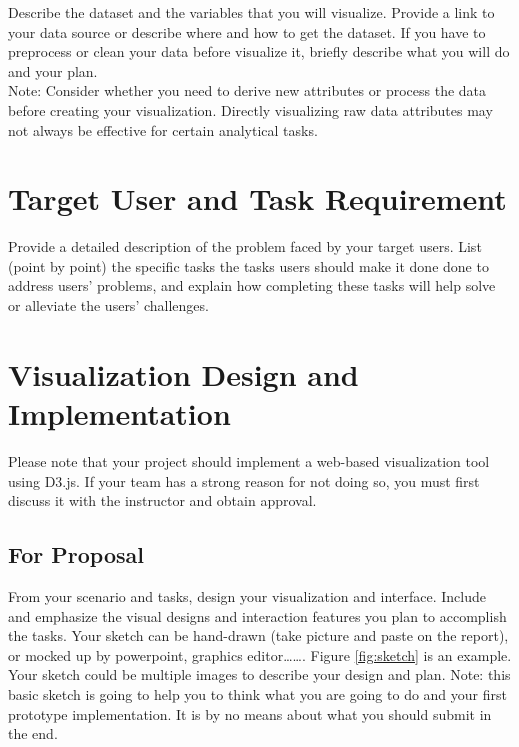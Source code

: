 \documentclass[journal]{IEEEtran}
\begin{document}
Describe the dataset and the variables that you will visualize. Provide a link to your data source or describe where and how to get the dataset. If you have to preprocess or clean your data before visualize it, briefly describe what you will do and your plan. \\

Note: Consider whether you need to derive new attributes or process the data before creating your visualization. Directly visualizing raw data attributes may not always be effective for certain analytical tasks. 


\section{Target User and Task Requirement}

Provide a detailed description of the problem faced by your target users. List (point by point) the specific tasks the tasks users should make it done done to address users' problems, and explain how completing these tasks will help solve or alleviate the users’ challenges.


\section{Visualization Design and Implementation}

Please note that your project should implement a web-based visualization tool using D3.js. If your team has a strong reason for not doing so, you must first discuss it with the instructor and obtain approval.

\subsection{For Proposal}
From your scenario and tasks, design your visualization and interface.
Include and emphasize the visual designs and interaction features you plan to accomplish the tasks.
Your sketch can be hand-drawn (take picture and paste on the report), or mocked up by powerpoint, graphics editor……. Figure \ref{fig:sketch} is an example.
Your sketch could be multiple images to describe your design and plan.
Note: this basic sketch is going to help you to think what you are going to do and your first prototype implementation. It is by no means about what you should submit in the end.
\end{document}
